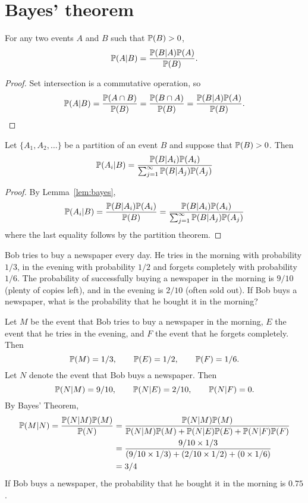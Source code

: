 \section{Bayes' theorem}

\begin{lemma}\label{lem:bayes}
For any two events $A$ and $B$ such that $\mathbb{P}(B)>0$,
\[
\mathbb{P}(A|B) = \frac{\mathbb{P}(B|A)\mathbb{P}(A)}{\mathbb{P}(B)}.
\]
\begin{proof}
Set intersection is a commutative operation, so
\[
\mathbb{P}(A|B) = \frac{\mathbb{P}(A\cap B)}{\mathbb{P}(B)} = \frac{\mathbb{P}(B\cap A)}{\mathbb{P}(B)} = \frac{\mathbb{P}(B|A)\mathbb{P}(A)}{\mathbb{P}(B)}.
\]
\end{proof}
\end{lemma}

\begin{theorem}\label{thm:bayes}
Let $\{A_1,A_2,\ldots\}$ be a partition of an event $B$ and suppose that $\mathbb{P}(B)>0$. Then
\[
\mathbb{P}(A_i|B) = \frac{\mathbb{P}(B|A_i)\mathbb{P}(A_i)}{\sum_{j=1}^{\infty} \mathbb{P}(B|A_j)\mathbb{P}(A_j)}
\]
\begin{proof}
By Lemma~\ref{lem:bayes},
\[
\mathbb{P}(A_i|B) 
	= \frac{\mathbb{P}(B|A_i)\mathbb{P}(A_i)}{\mathbb{P}(B)}
	= \frac{\mathbb{P}(B|A_i)\mathbb{P}(A_i)}{\sum_{j=1}^{\infty} \mathbb{P}(B|A_j)\mathbb{P}(A_j)}
\]
where the last equality follows by the partition theorem.
\end{proof}
\end{theorem}

\begin{example}
Bob tries to buy a newspaper every day. He tries in the morning with probability $1/3$, in the evening with probability $1/2$ and forgets completely with probability $1/6$. The probability of successfully buying a newspaper in the morning is $9/10$ (plenty of copies left), and in the evening is $2/10$ (often sold out). If Bob buys a newspaper, what is the probability that he bought it in the morning?
\begin{solution}
Let $M$ be the event that Bob tries to buy a newspaper in the morning, $E$ the event that he tries in the evening, and $F$ the event that he forgets completely. Then
\[
\mathbb{P}(M) = 1/3, \qquad \mathbb{P}(E) = 1/2, \qquad \mathbb{P}(F) = 1/6.
\]
Let $N$ denote the event that Bob buys a newspaper. Then
\[
\mathbb{P}(N|M) = 9/10, \qquad \mathbb{P}(N|E) = 2/10, \qquad \mathbb{P}(N|F) = 0.
\]
By Bayes' Theorem,
\begin{align*}
\mathbb{P}(M|N) = \frac{\mathbb{P}(N|M)\mathbb{P}(M)}{\mathbb{P}(N)}
	& = \frac{\mathbb{P}(N|M)\mathbb{P}(M)}{\mathbb{P}(N|M)\mathbb{P}(M) + \mathbb{P}(N|E)\mathbb{P}(E) + \mathbb{P}(N|F)\mathbb{P}(F)} \\
	& = \frac{9/10\times 1/3}{(9/10\times 1/3) + (2/10\times 1/2) + (0\times 1/6)} \\
	& = 3/4
\end{align*}
If Bob buys a newspaper, the probability that he bought it in the morning is $0.75$.
\end{solution}
\end{example}



